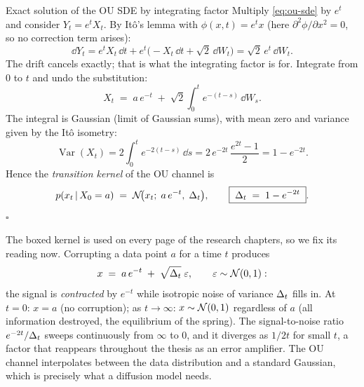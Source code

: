\begin{toolbox}{Exact solution of the OU SDE by integrating factor}
Multiply \eqref{eq:ou-sde} by $e^{t}$ and consider $Y_t = e^{t} X_t$. By
It\^o's lemma with $\phi(x,t) = e^{t}x$ (here
$\partial^2 \phi/\partial x^2 = 0$, so no correction term arises):
\begin{equation*}
  \dd Y_t
  = e^{t} X_t\,\dd t + e^{t}\big( -X_t\,\dd t + \sqrt{2}\,\dd W_t \big)
  = \sqrt{2}\, e^{t}\, \dd W_t .
\end{equation*}
The drift cancels exactly; that is what the integrating factor is for.
Integrate from $0$ to $t$ and undo the substitution:
\begin{equation*}
  X_t \;=\; a\, e^{-t} \;+\; \sqrt{2} \int_0^t e^{-(t-s)}\, \dd W_s .
\end{equation*}
The integral is Gaussian (limit of Gaussian sums), with mean zero and
variance given by the It\^o isometry:
\begin{equation*}
  \operatorname{Var}(X_t)
  = 2 \int_0^t e^{-2(t-s)}\, \dd s
  = 2\, e^{-2t}\, \frac{e^{2t} - 1}{2}
  = 1 - e^{-2t} .
\end{equation*}
Hence the \emph{transition kernel} of the OU channel is
\begin{equation*}
  p(x_t \,|\, X_0 = a)
  \;=\; \mathcal{N}\!\big( x_t;\; a\,e^{-t},\; \Delta_t \big),
  \qquad
  \boxed{\;\Delta_t \;=\; 1 - e^{-2t}\;} .
\end{equation*}
\hfill$\square$
\end{toolbox}

The boxed kernel is used on every page of the research chapters, so we
fix its reading now. Corrupting a data point $a$ for a time $t$ produces
\begin{equation}
  x \;=\; a\, e^{-t} \;+\; \sqrt{\Delta_t}\;\varepsilon,
  \qquad \varepsilon \sim \mathcal{N}(0, 1):
  \label{eq:ou-channel}
\end{equation}
the signal is \emph{contracted} by $e^{-t}$ while isotropic noise of
variance $\Delta_t$ fills in. At $t = 0$: $x = a$ (no corruption); as
$t \to \infty$: $x \sim \mathcal{N}(0, 1)$ regardless of $a$ (all information
destroyed, the equilibrium of the spring). The signal-to-noise ratio
$e^{-2t}/\Delta_t$ sweeps continuously from $\infty$ to $0$, and it
diverges as $1/2t$ for small $t$, a factor that reappears throughout the
thesis as an error amplifier. The OU channel interpolates between the
data distribution and a standard Gaussian, which is precisely what a
diffusion model needs.


